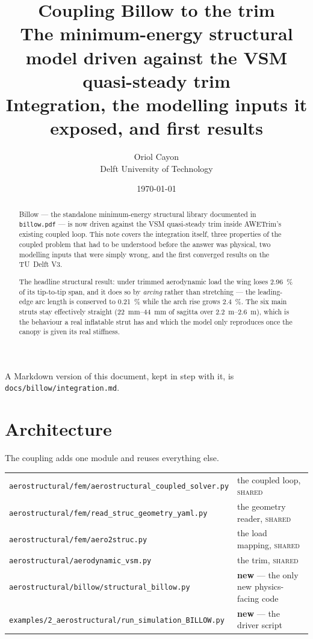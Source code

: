 \documentclass[11pt,a4paper]{article}
\title{%
  \vspace{-1.5cm}
  {\Huge\textbf{Coupling Billow to the trim}}\\[6pt]
  {\large The minimum-energy structural model driven against the VSM
   quasi-steady trim}\\[10pt]
  {\normalsize Integration, the modelling inputs it exposed, and first results}
}
\author{Oriol Cayon \\ \small Delft University of Technology}
\date{\today}
\newcommand{\code}[1]{\texttt{\small #1}}
\begin{document}
\maketitle
\thispagestyle{fancy}

\begin{abstract}
\noindent
Billow --- the standalone minimum-energy structural library documented in
\code{billow.pdf} --- is now driven against the VSM quasi-steady trim inside
AWETrim's existing coupled loop. This note covers the integration itself, three
properties of the coupled problem that had to be understood before the answer
was physical, two modelling inputs that were simply wrong, and the first
converged results on the TU~Delft V3.

The headline structural result: under trimmed aerodynamic load the wing loses
\SI{2.96}{\percent} of its tip-to-tip span, and it does so by \emph{arcing}
rather than stretching --- the leading-edge arc length is conserved to
\SI{0.21}{\percent} while the arch rise grows \SI{2.4}{\percent}. The six main
struts stay effectively straight (\SIrange{22}{44}{\milli\metre} of sagitta over
\SIrange{2.2}{2.6}{\metre}), which is the behaviour a real inflatable strut has
and which the model only reproduces once the canopy is given its real stiffness.
\end{abstract}

\vspace{0.4em}
\noindent\textcolor{muted}{\small A Markdown version of this document, kept in
step with it, is \code{docs/billow/integration.md}.}

\tableofcontents
\vspace{1em}

\section{Architecture}

The coupling adds one module and reuses everything else.

\begin{center}\small
\begin{tabular}{@{}ll@{}}
\toprule
\code{aerostructural/fem/aerostructural\_coupled\_solver.py} & the coupled loop, \textsc{shared} \\
\code{aerostructural/fem/read\_struc\_geometry\_yaml.py} & the geometry reader, \textsc{shared} \\
\code{aerostructural/fem/aero2struc.py} & the load mapping, \textsc{shared} \\
\code{aerostructural/aerodynamic\_vsm.py} & the trim, \textsc{shared} \\
\code{aerostructural/billow/structural\_billow.py} & \textbf{new} --- the only new physics-facing code \\
\code{examples/2_aerostructural/run\_simulation\_BILLOW.py} & \textbf{new} --- the driver script \\
\bottomrule
\end{tabular}
\end{center}
\end{document}
